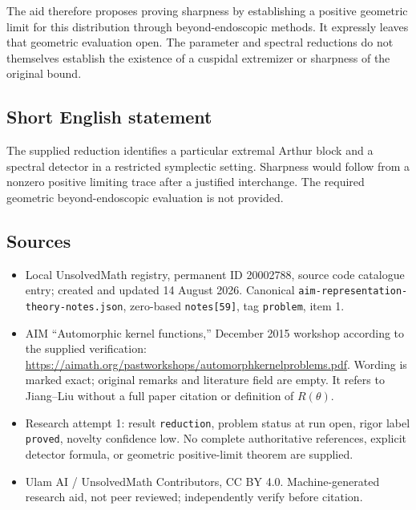 \documentclass[11pt]{article}
\begin{document}
The aid therefore proposes proving sharpness by establishing a positive geometric limit for this distribution through beyond-endoscopic methods. It expressly leaves that geometric evaluation open. The parameter and spectral reductions do not themselves establish the existence of a cuspidal extremizer or sharpness of the original bound.
\subsection{Short English statement}
The supplied reduction identifies a particular extremal Arthur block and a spectral detector in a restricted symplectic setting. Sharpness would follow from a nonzero positive limiting trace after a justified interchange. The required geometric beyond-endoscopic evaluation is not provided.
\subsection{Sources}
\begin{itemize}
\item Local UnsolvedMath registry, permanent ID 20002788, source code catalogue entry; created and updated 14 August 2026. Canonical \texttt{aim-representation-theory-notes.json}, zero-based \texttt{notes[59]}, tag \texttt{problem}, item 1.
\item AIM ``Automorphic kernel functions,'' December 2015 workshop according to the supplied verification: \url{https://aimath.org/pastworkshops/automorphkernelproblems.pdf}. Wording is marked exact; original remarks and literature field are empty. It refers to Jiang--Liu without a full paper citation or definition of $R(\theta)$.
\item Research attempt 1: result \texttt{reduction}, problem status at run open, rigor label \texttt{proved}, novelty confidence low. No complete authoritative references, explicit detector formula, or geometric positive-limit theorem are supplied.
\item Ulam AI / UnsolvedMath Contributors, CC BY 4.0. Machine-generated research aid, not peer reviewed; independently verify before citation.
\end{itemize}
\end{document}
